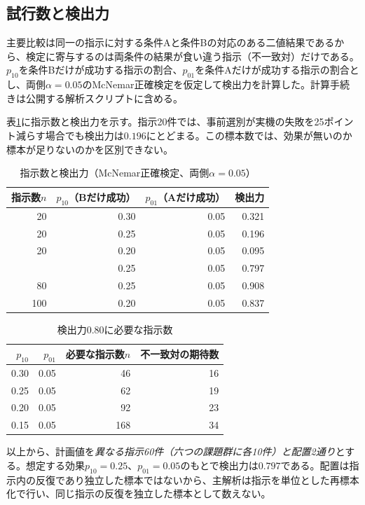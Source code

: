 \documentclass[10pt,letterpaper]{article}
\begin{document}
\subsection{試行数と検出力}\label{sec:power}
主要比較は同一の指示に対する条件Aと条件Bの対応のある二値結果であるから、検定に寄与するのは両条件の結果が食い違う指示（不一致対）だけである。$p_{10}$を条件Bだけが成功する指示の割合、$p_{01}$を条件Aだけが成功する指示の割合とし、両側$\alpha=0.05$のMcNemar正確検定を仮定して検出力を計算した。計算手続きは公開する解析スクリプトに含める。

表\ref{tab:power}に指示数と検出力を示す。指示20件では、事前選別が実機の失敗を25ポイント減らす場合でも検出力は$0.196$にとどまる。この標本数では、効果が無いのか標本が足りないのかを区別できない。

\begin{table}[h]
\centering\small
\caption{指示数と検出力（McNemar正確検定、両側$\alpha=0.05$）}
\label{tab:power}
\begin{tabular}{rrrr}
\toprule
指示数$n$ & $p_{10}$（Bだけ成功） & $p_{01}$（Aだけ成功） & 検出力 \\
\midrule
20 & 0.30 & 0.05 & 0.321 \\
20 & 0.25 & 0.05 & 0.196 \\
20 & 0.20 & 0.05 & 0.095 \\
\addlinespace
60 & 0.25 & 0.05 & 0.797 \\
80 & 0.25 & 0.05 & 0.908 \\
100 & 0.20 & 0.05 & 0.837 \\
\bottomrule
\end{tabular}
\end{table}

\begin{table}[h]
\centering\small
\caption{検出力$0.80$に必要な指示数}
\label{tab:reqn}
\begin{tabular}{rrrr}
\toprule
$p_{10}$ & $p_{01}$ & 必要な指示数$n$ & 不一致対の期待数 \\
\midrule
0.30 & 0.05 & 46 & 16 \\
0.25 & 0.05 & 62 & 19 \\
0.20 & 0.05 & 92 & 23 \\
0.15 & 0.05 & 168 & 34 \\
\bottomrule
\end{tabular}
\end{table}

以上から、計画値を\emph{異なる指示60件（六つの課題群に各10件）と配置2通り}とする。想定する効果$p_{10}=0.25$、$p_{01}=0.05$のもとで検出力は$0.797$である。配置は指示内の反復であり独立した標本ではないから、主解析は指示を単位とした再標本化で行い、同じ指示の反復を独立した標本として数えない。
\end{document}
